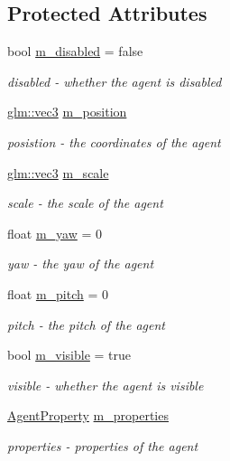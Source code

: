 \subsection*{Protected Attributes}
\begin{DoxyCompactItemize}
\item 
bool \hyperlink{struct_agent_aa0d2f2202888755e79f3d8022e79d816}{m\+\_\+disabled} = false
\begin{DoxyCompactList}\small\item\em disabled -\/ whether the agent is disabled \end{DoxyCompactList}\item 
\hyperlink{_types_8h_a3d0ce73e3199de81565fb01632415288}{glm\+::vec3} \hyperlink{struct_agent_aba44b4b1781713d1ec074b079c5dc4e1}{m\+\_\+position}
\begin{DoxyCompactList}\small\item\em posistion -\/ the coordinates of the agent \end{DoxyCompactList}\item 
\hyperlink{_types_8h_a3d0ce73e3199de81565fb01632415288}{glm\+::vec3} \hyperlink{struct_agent_abc8afe26ba8fbe75eba18ee7ccf45c7e}{m\+\_\+scale}
\begin{DoxyCompactList}\small\item\em scale -\/ the scale of the agent \end{DoxyCompactList}\item 
float \hyperlink{struct_agent_ab247e82de72e83d05afea649311a9314}{m\+\_\+yaw} = 0
\begin{DoxyCompactList}\small\item\em yaw -\/ the yaw of the agent \end{DoxyCompactList}\item 
float \hyperlink{struct_agent_aec2384613e952e3f4e280985743f41ce}{m\+\_\+pitch} = 0
\begin{DoxyCompactList}\small\item\em pitch -\/ the pitch of the agent \end{DoxyCompactList}\item 
bool \hyperlink{struct_agent_a0155e68895c28427071104719d710fc1}{m\+\_\+visible} = true
\begin{DoxyCompactList}\small\item\em visible -\/ whether the agent is visible \end{DoxyCompactList}\item 
\hyperlink{_agent_8h_ab486bd3cbb07abc600b5b7586f95f7f5}{Agent\+Property} \hyperlink{struct_agent_a323d48d9a1fe0b993aad8700e051d4c4}{m\+\_\+properties}
\begin{DoxyCompactList}\small\item\em properties -\/ properties of the agent \end{DoxyCompactList}\end{DoxyCompactItemize}


